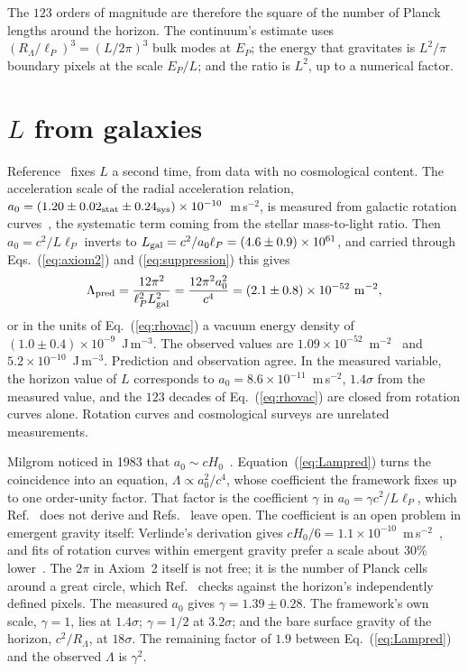 \documentclass[aps,prd,twocolumn,superscriptaddress,nofootinbib,showkeys]{revtex4-2}
\begin{document}
The $123$ orders of magnitude are therefore the square of the number of Planck lengths around the horizon. The continuum's estimate uses $(R_\Lambda/\ell_P)^3 = (L/2\pi)^3$ bulk modes at $E_P$; the energy that gravitates is $L^2/\pi$ boundary pixels at the scale $E_P/L$; and the ratio is $L^2$, up to a numerical factor.

\section{\texorpdfstring{$L$}{L} from galaxies}
\label{sec:galactic}

Reference~\cite{korytko2026} fixes $L$ a second time, from data with no cosmological content. The acceleration scale of the radial acceleration relation, $a_0=(1.20\pm0.02_{\rm stat}\pm0.24_{\rm sys})\times10^{-10}$~m\,s$^{-2}$, is measured from galactic rotation curves~\cite{mcgaugh2016}, the systematic term coming from the stellar mass-to-light ratio. Then $a_0=c^2/L\ell_P$ inverts to $L_{\rm gal}=c^2/a_0\ell_P=(4.6\pm0.9)\times10^{61}$, and carried through Eqs.~(\ref{eq:axiom2}) and (\ref{eq:suppression}) this gives
\begin{equation}
\Lambda_{\rm pred} = \frac{12\pi^2}{\ell_P^2L_{\rm gal}^2} = \frac{12\pi^2a_0^2}{c^4} = (2.1\pm0.8)\times10^{-52}~{\rm m^{-2}},
\label{eq:Lampred}
\end{equation}
or in the units of Eq.~(\ref{eq:rhovac}) a vacuum energy density of $(1.0\pm0.4)\times10^{-9}$~J\,m$^{-3}$. The observed values are $1.09\times10^{-52}$~m$^{-2}$~\cite{planck2018} and $5.2\times10^{-10}$~J\,m$^{-3}$. Prediction and observation agree. In the measured variable, the horizon value of $L$ corresponds to $a_0 = 8.6\times10^{-11}$~m\,s$^{-2}$, $1.4\sigma$ from the measured value, and the $123$ decades of Eq.~(\ref{eq:rhovac}) are closed from rotation curves alone. Rotation curves and cosmological surveys are unrelated measurements.

Milgrom noticed in 1983 that $a_0\sim cH_0$~\cite{milgrom1983}. Equation~(\ref{eq:Lampred}) turns the coincidence into an equation, $\Lambda\propto a_0^2/c^4$, whose coefficient the framework fixes up to one order-unity factor. That factor is the coefficient $\gamma$ in $a_0 = \gamma c^2/L\ell_P$, which Ref.~\cite{korytko2026} does not derive and Refs.~\cite{korytko2026c,korytko2026d} leave open. The coefficient is an open problem in emergent gravity itself: Verlinde's derivation gives $cH_0/6 = 1.1\times10^{-10}$~m\,s$^{-2}$~\cite{verlinde2017}, and fits of rotation curves within emergent gravity prefer a scale about $30\%$ lower~\cite{yoon2023,yoon2025}. The $2\pi$ in Axiom~2 itself is not free; it is the number of Planck cells around a great circle, which Ref.~\cite{korytko2026d} checks against the horizon's independently defined pixels. The measured $a_0$ gives $\gamma = 1.39\pm0.28$. The framework's own scale, $\gamma = 1$, lies at $1.4\sigma$; $\gamma = 1/2$ at $3.2\sigma$; and the bare surface gravity of the horizon, $c^2/R_\Lambda$, at $18\sigma$. The remaining factor of $1.9$ between Eq.~(\ref{eq:Lampred}) and the observed $\Lambda$ is $\gamma^2$.
\end{document}
